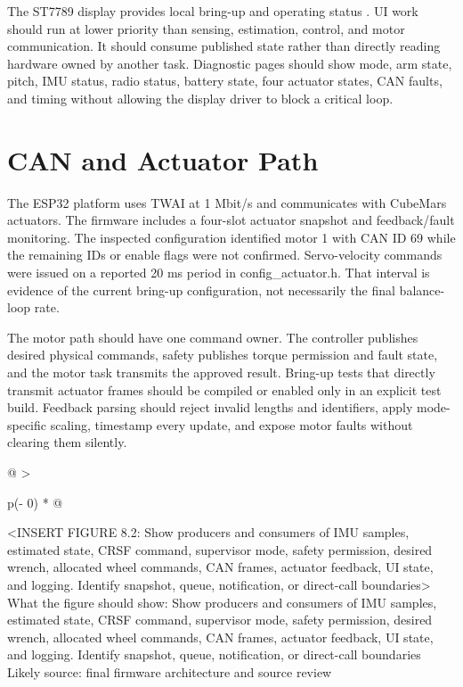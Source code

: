 The ST7789 display provides local bring-up and operating status
\cite{waveshare2026lcd}. UI work should run at lower priority than sensing, estimation,
control, and motor communication. It should consume published state
rather than directly reading hardware owned by another task. Diagnostic
pages should show mode, arm state, pitch, IMU status, radio status,
battery state, four actuator states, CAN faults, and timing without
allowing the display driver to block a critical loop.

\section{CAN and Actuator Path}\label{can-and-actuator-path}

The ESP32 platform uses TWAI at 1 Mbit\slash{}s and communicates with CubeMars
actuators. The firmware includes a four-slot actuator snapshot and
feedback\slash{}fault monitoring. The inspected configuration identified motor
1 with CAN ID 69 while the remaining IDs or enable flags were not
confirmed. Servo-velocity commands were issued on a reported 20 ms
period in config\_actuator.h. That interval is evidence of the current
bring-up configuration, not necessarily the final balance-loop rate.

The motor path should have one command owner. The controller publishes
desired physical commands, safety publishes torque permission and fault
state, and the motor task transmits the approved result. Bring-up tests
that directly transmit actuator frames should be compiled or enabled
only in an explicit test build. Feedback parsing should reject invalid
lengths and identifiers, apply mode-specific scaling, timestamp every
update, and expose motor faults without clearing them silently.

\begin{longtable}[]{@{}
  >{\raggedright\arraybackslash}p{(\columnwidth - 0\tabcolsep) * }@{}}
\toprule\noalign{}
\begin{minipage}[b]{\linewidth}\raggedright
\textless INSERT FIGURE 8.2: Show producers and consumers of IMU
samples, estimated state, CRSF command, supervisor mode, safety
permission, desired wrench, allocated wheel commands, CAN frames,
actuator feedback, UI state, and logging. Identify snapshot, queue,
notification, or direct-call boundaries\textgreater{}\\
What the figure should show: Show producers and consumers of IMU
samples, estimated state, CRSF command, supervisor mode, safety
permission, desired wrench, allocated wheel commands, CAN frames,
actuator feedback, UI state, and logging. Identify snapshot, queue,
notification, or direct-call boundaries\\
Likely source: final firmware architecture and source review\strut
\end{minipage} \\
\midrule\noalign{}
\endhead
\bottomrule\noalign{}
\endlastfoot
\end{longtable}

